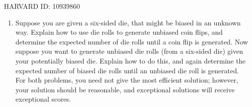 \documentclass[11pt]{article}
\begin{document}
HARVARD ID: 10939860

\begin{enumerate}



\item Suppose you are given a six-sided die, that might be biased in
an unknown way. Explain how to use die rolls to generate unbiased coin
flips, and determine the expected number of die rolls until a coin
flip is generated.  Now suppose you want to generate unbiased die
rolls (from a six-sided die) given your potentially biased die.
Explain how to do this, and again determine the expected number of
biased die rolls until an unbiased die roll is generated.  For both
problems, you need not give the most efficient solution; however, your
solution should be reasonable, and exceptional solutions will receive
exceptional scores.


\end{enumerate}
\end{document}
